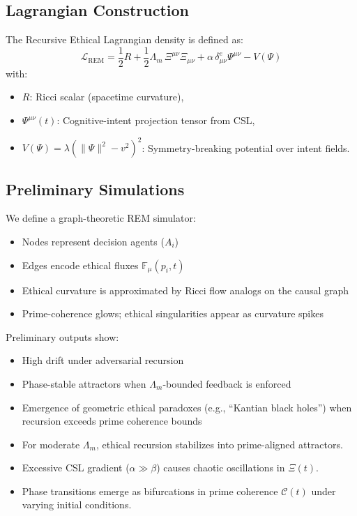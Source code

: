 \documentclass{article}
\theoremstyle{plain}
\begin{document}
\subsection{Lagrangian Construction}

The Recursive Ethical Lagrangian density is defined as:
\[
\mathcal{L}_{\text{REM}} = \frac{1}{2} R + \frac{1}{2} \Lambda_m \, \Xi^{\mu\nu} \Xi_{\mu\nu} + \alpha \, \delta^e_{\mu\nu} \Psi^{\mu\nu} - V(\Psi)
\]
with:
\begin{itemize}
  \item $R$: Ricci scalar (spacetime curvature),
  \item $\Psi^{\mu\nu}(t)$: Cognitive-intent projection tensor from CSL,
  \item $V(\Psi) = \lambda(\|\Psi\|^2 - v^2)^2$: Symmetry-breaking potential over intent fields.
\end{itemize}
\subsection{Preliminary Simulations}

We define a graph-theoretic REM simulator:
\begin{itemize}
  \item Nodes represent decision agents ($A_i$)
  \item Edges encode ethical fluxes $\mathbb{F}_{\mu}(p_i, t)$
  \item Ethical curvature is approximated by Ricci flow analogs on the causal graph
  \item Prime-coherence glows; ethical singularities appear as curvature spikes
\end{itemize}

Preliminary outputs show:
\begin{itemize}
  \item High drift under adversarial recursion
  \item Phase-stable attractors when $\Lambda_m$-bounded feedback is enforced
  \item Emergence of geometric ethical paradoxes (e.g., “Kantian black holes”) when recursion exceeds prime coherence bounds
  \item For moderate $\Lambda_m$, ethical recursion stabilizes into prime-aligned attractors.
  \item Excessive CSL gradient ($\alpha \gg \beta$) causes chaotic oscillations in $\Xi(t)$.
  \item Phase transitions emerge as bifurcations in prime coherence $\mathcal{C}(t)$ under varying initial conditions.
\end{itemize}
\end{document}
